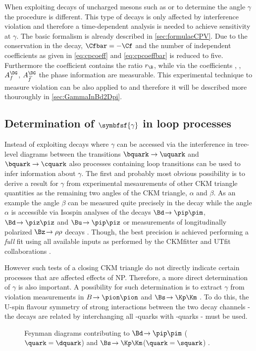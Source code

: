 When exploiting decays of uncharged \B mesons such as \BsToDsK or \BdToDpi to determine the angle $\gamma$ the procedure is different.
This type of decays is only affected by interference \CP violation and therefore a time-dependent analysis is needed to achieve sensitivity at $\gamma$.
The basic formalism is already described in \cref{sec:formulaeCPV}.
Due to the \CP conservation in the decay, $\Cfbar=-\Cf$ and the number of independent coefficients as given in \cref{eq:cpcoeff} and \cref{eq:cpcoeffbar} is reduced to five.
Furthermore the \CP coefficient \Cf contains the ratio $r_\B$, while via the coefficients \Sf, \Sfbar, $A_f^{\DG}$, $A_{\kern 1.5pt\overline{\kern -1.5pt f\kern 1.5pt}}^{\DG}$ the phase information are measurable.
This experimental technique to measure \CP violation can be also applied to \BdToDpi and therefore it will be described more thouroughly in \cref{sec:GammaInBd2Dpi}.

\subsection[head={Determination of $\gamma$ in loop processes},tocentry={Determination of $\gamma$ in loop processes}]{Determination of $\symbfsf{\gamma}$ in loop processes}
\label{sec:gamamInLoops}
Instead of exploiting decays where $\gamma$ can be accessed via the interference in tree-level diagrams between the transitions $\bquark\to\uquark$ and $\bquark\to\cquark$ also processes containing loop transitions can be used to infer information about $\gamma$.
The first and probably most obvious possibility is to derive a result for $\gamma$ from experimental mesaurements of other CKM triangle quantities as the remaining two angles of the CKM triangle, $\alpha$ and $\beta$.
As an example the angle $\beta$ can be measured quite precisely in the decay \BdToJPsiKS while the angle $\alpha$ is accessible via Isospin analyses of the decays $\Bd\!\to\pip\pim$, $\Bd\!\to\piz\piz$ and $\Bu\!\to\pip\piz$ \cite{IsospinAlpha} or measurements of longitudinally polarized $\Bz\!\to\rho\rho$ decays \cite{alpha_BaBar, alpha_Belle}. Though, the best precision is achieved performing a \emph{full} fit using all available inputs as performed by the CKMfitter and UTfit collaborations \cite{CKMfitter2015, UTfit-UT}.

However such tests of a closing CKM triangle do not directly indicate certain processes that are affected effects of \ac{NP}.
Therefore, a more direct determination of $\gamma$ is also important.
A possibility for such determination is to extract $\gamma$ from \CP violation measurements in $B\!\to\pion\pion$ and $\Bs\!\to\Kp\Km$ \cite{GammaInLoops_Fleischer, GammaInLoops_Ciuchini}.
To do this, the U-spin flavour symmetry of strong interactions between the two decay channels - \ie the decays are related by interchanging all \dquark-quarks with \squark-quarks - must be used.
\begin{figure}[tbp]
	\centering
	
	\hfill
	
	\caption{Feynman diagrams contributing to $\Bd\!\to\pip\pim$ ($\quark=\dquark$) and $\Bs\!\to\Kp\Km$($\quark=\squark$) \cite{Ellis:2016jkw}.}
	\label{fig:feynmanGammaLoops}
\end{figure}

